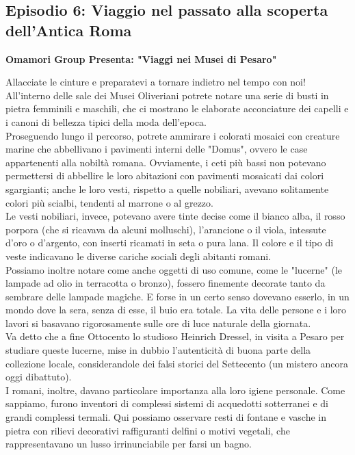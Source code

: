 \documentclass[hidelinks,12pt,a4paper]{article}
\begin{document}
\begin{flushleft}
		\subsection{Episodio 6: Viaggio nel passato alla scoperta dell'Antica Roma}
		\begin{center}
			\textbf{Omamori Group Presenta: "Viaggi nei Musei di Pesaro"}
		\end{center}
		Allacciate le cinture e preparatevi a tornare indietro nel tempo con noi!\\
		All'interno delle sale dei Musei Oliveriani potrete notare una serie di busti in pietra femminili e maschili, che ci mostrano le elaborate acconciature dei capelli e i canoni di bellezza tipici della moda dell'epoca.\\ 
		Proseguendo lungo il percorso, potrete ammirare i colorati mosaici con creature marine che abbellivano i pavimenti interni delle "Domus", ovvero le case appartenenti alla nobiltà romana. Ovviamente, i ceti più bassi non potevano permettersi di abbellire le loro abitazioni con pavimenti mosaicati dai colori sgargianti; anche le loro vesti, rispetto a quelle nobiliari, avevano solitamente colori più scialbi, tendenti al marrone o al grezzo.\\
		Le vesti nobiliari, invece, potevano avere tinte decise come il bianco alba, il rosso porpora (che si ricavava da alcuni molluschi), l'arancione o il viola, intessute d'oro o d'argento, con inserti ricamati in seta o pura lana. Il colore e il tipo di veste indicavano le diverse cariche sociali degli abitanti romani.\\
		Possiamo inoltre notare come anche oggetti di uso comune, come le "lucerne" (le lampade ad olio in terracotta o bronzo), fossero finemente decorate tanto da sembrare delle lampade magiche. E forse in un certo senso dovevano esserlo, in un mondo dove la sera, senza di esse, il buio era totale. La vita delle persone e i loro lavori si basavano rigorosamente sulle ore di luce naturale della giornata.\\
		Va detto che a fine Ottocento lo studioso Heinrich Dressel, in visita a Pesaro per studiare queste lucerne, mise in dubbio l'autenticità di buona parte della collezione locale, considerandole dei falsi storici del Settecento (un mistero ancora oggi dibattuto).\\
		I romani, inoltre, davano particolare importanza alla loro igiene personale. Come sappiamo, furono inventori di complessi sistemi di acquedotti sotterranei e di grandi complessi termali. Qui possiamo osservare resti di fontane e vasche in pietra con rilievi decorativi raffiguranti delfini o motivi vegetali, che rappresentavano un lusso irrinunciabile per farsi un bagno.\\

\end{flushleft}
\end{document}
